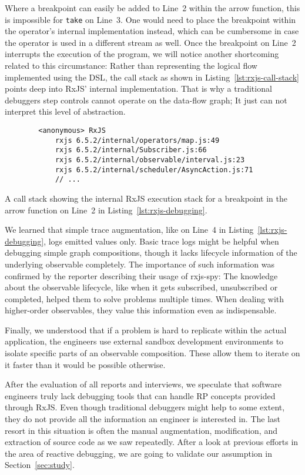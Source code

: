 \documentclass[sigplan,screen,review]{acmart}
\begin{document}
Where a breakpoint can easily be added to Line~2 within the arrow function, this is impossible for \texttt{take} on Line~3. One would need to place the breakpoint within the operator's internal implementation instead, which can be cumbersome in case the operator is used in a different stream as well. Once the breakpoint on Line~2 interrupts the execution of the program, we will notice another shortcoming related to this circumstance: Rather than representing the logical flow implemented using the DSL, the call stack as shown in Listing~\ref{lst:rxjs-call-stack} points deep into RxJS' internal implementation. That is why a traditional debuggers step controls cannot operate on the data-flow graph; It just can not interpret this level of abstraction.

\begin{listing}
	\begin{verbatim}
		<anonymous> RxJS
			rxjs 6.5.2/internal/operators/map.js:49
			rxjs 6.5.2/internal/Subscriber.js:66
			rxjs 6.5.2/internal/observable/interval.js:23
			rxjs 6.5.2/internal/scheduler/AsyncAction.js:71
			// ...
	\end{verbatim}
	\caption{A call stack showing the internal RxJS execution stack for a breakpoint in the arrow function on Line~2 in Listing~\ref{lst:rxjs-debugging}.}
	\label{lst:rxjs-call-stack}
\end{listing}

We learned that simple trace augmentation, like on Line~4 in Listing~\ref{lst:rxjs-debugging}, logs emitted values only. Basic trace logs might be helpful when debugging simple graph compositions, though it lacks lifecycle information of the underlying observable completely. The importance of such information was confirmed by the reporter describing their usage of rxjs-spy: The knowledge about the observable lifecycle, like when it gets subscribed, unsubscribed or completed, helped them to solve problems multiple times. When dealing with higher-order observables, they value this information even as indispensable.

Finally, we understood that if a problem is hard to replicate within the actual application, the engineers use external sandbox development environments to isolate specific parts of an observable composition. These allow them to iterate on it faster than it would be possible otherwise.

After the evaluation of all reports and interviews, we speculate that software engineers truly lack debugging tools that can handle RP concepts provided through RxJS. Even though traditional debuggers might help to some extent, they do not provide all the information an engineer is interested in. The last resort in this situation is often the manual augmentation, modification, and extraction of source code as we saw repeatedly. After a look at previous efforts in the area of reactive debugging, we are going to validate our assumption in Section~\ref{sec:study}.
\end{document}
